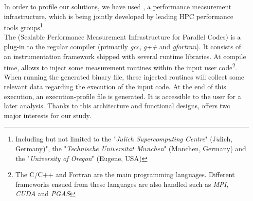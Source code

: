 		In order to profile our solutions, we have used \toolProfiling \cite{knupfer2012score}, a performance measurement infrastructure, which is being jointly developed by leading HPC performance tools groups\footnote{Including but not limited to the "\emph{J$\ddot{u}$lich Supercomputing Centre}" (J$\ddot{u}$lich, Germany)", the "\emph{Technische Universitat M$\ddot{u}$nchen}" (M$\ddot{u}$nchen, Germany) and the "\emph{University of Oregon}" (Eugene, USA)}.\\
		The \toolProfiling\space (Scalable Performance Measurement Infrastructure for Parallel Codes) is a plug-in to the regular compiler (primarily \emph{gcc}, \emph{g++} and \emph{gfortran}).   It consists of an instrumentation framework shipped with several runtime libraries.   At compile time, \toolProfiling\space allows to inject some measurement routines within the input user code\footnote{The C/C++ and Fortran are the main programming languages.   Different frameworks ensued from these languages are also handled such as \emph{MPI}\cite{karniadakis2003parallel}, \emph{CUDA}\cite{langdon2014genetically} and \emph{PGAS}\cite{zheng2014upc++}}.   When running the generated binary file, these injected routines will collect some relevant data regarding the execution of the input code.   At the end of this execution, an execution-profile file is generated.   It is accessible to the user for a later analysis.   Thanks to this architecture and functional designs, \toolProfiling\space offers two major interests for our study.\\

